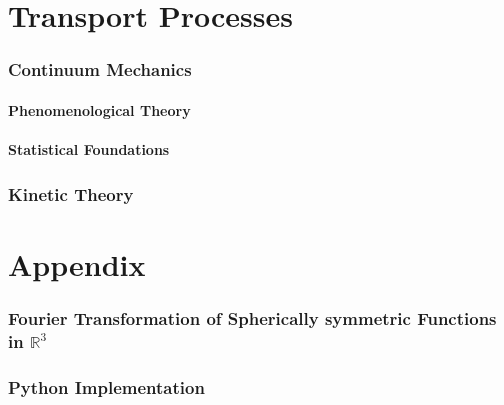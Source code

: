\documentclass[a4paper,11pt]{article}
\begin{document}
\part{Transport Processes}
\section{Continuum Mechanics}
\subsection{Phenomenological Theory}
\subsection{Statistical Foundations}

\section{Kinetic Theory}

\part{Appendix}
\appendix
\section{Fourier Transformation of Spherically symmetric Functions in $\mathbb{R}^3$}\label{sec:ft_3d}

\section{Python Implementation}
\end{document}

